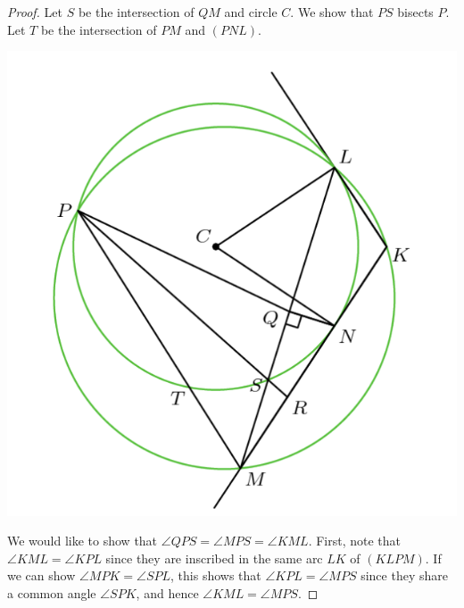 \documentclass[12pt]{scrartcl}
\newcommand{\<}{\langle}
\renewcommand{\>}{\rangle}
\begin{document}
\begin{proof}
Let $S$ be the intersection of $QM$ and circle $C$.  We show that $PS$ bisects $P$.  Let $T$ be the intersection of $PM$ and $(PNL)$.   
\begin{center}
\includegraphics[scale=0.7]{graphics/p2-6.png}
\end{center}

We would like to show that $\angle QPS = \angle MPS = \angle KML$.  First, note that $\angle KML = \angle KPL$ since they are inscribed in the same arc $LK$ of $(KLPM)$.   If we can show $\angle MPK = \angle SPL$, this shows that $\angle KPL = \angle MPS$ since they share a common angle $\angle SPK$, and hence $\angle KML = \angle MPS$.


\end{proof}
\end{document}
